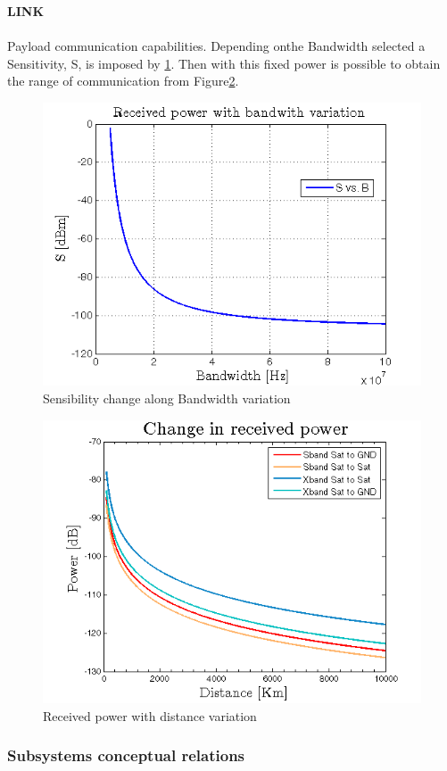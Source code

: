 \textbf{LINK} 
\paragraph{} Payload communication capabilities. Depending onthe Bandwidth selected a Sensitivity, S, is imposed by \ref{SvsB}. Then with this fixed power is possible to obtain the range of communication from Figure\ref{friis}.
\begin{figure}[h]
	\includegraphics[scale=0.9]{./sections/SatelliteConfiguration/SvsB}
	\centering
	\caption{Sensibility change along Bandwidth variation}
	\label{SvsB}
\end{figure}
\begin{figure}[h]
	\includegraphics[scale=0.9]{./sections/SatelliteConfiguration/friisCases}
	\centering
	\caption{Received power with distance variation}
	\label{friis}
\end{figure}
\newpage
\subsubsection{Subsystems conceptual relations}



